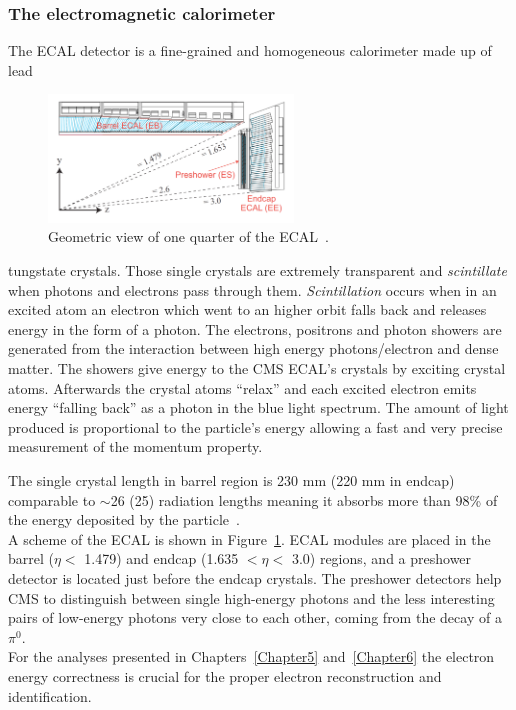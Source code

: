 \subsubsection{The electromagnetic calorimeter}
The ECAL detector is a fine-grained and homogeneous calorimeter
made up of lead
\begin{figure}
  \begin{center}
    \includegraphics[clip,trim=1cm 1cm 1cm 1.9cm, width=0.58\textwidth]{Figures/c2/ecal}
  \end{center}
  \caption{Geometric view of one quarter of the ECAL~\cite{Benaglia_2014}.}
\label{fig:ecal}
\end{figure}
 tungstate crystals. Those single crystals are extremely transparent
 and \emph{scintillate} when photons and electrons pass through
 them. \emph{Scintillation} occurs when in an excited atom an electron
 which went to an higher orbit falls back and
 releases energy in the form of a photon. The electrons, positrons and
 photon showers are generated from the interaction between high energy photons/electron and
 dense matter. The showers give energy to the CMS ECAL's crystals by
 exciting crystal atoms. Afterwards the crystal atoms ``relax'' and each
 excited electron
 emits energy ``falling back'' as a photon in the blue light spectrum.
The amount of light produced is proportional to the particle's energy
 allowing a fast and very precise measurement of the momentum
 property. 

The single crystal length in barrel region is 230 mm (220
 mm in endcap) comparable to $\sim$26 (25) radiation lengths meaning it
 absorbs more than 98\% of the energy deposited by the particle~\cite{Biino_2015}.\\
A scheme of the ECAL is shown in Figure~\ref{fig:ecal}.
ECAL modules are placed in the barrel ($\eta<$ 1.479) and endcap
(1.635 $<\eta<$ 3.0) regions, and a preshower detector is located just
before the endcap crystals. The preshower detectors help CMS to
distinguish between single high-energy photons and the less
interesting pairs of low-energy photons very close to each other, \ie
coming from the decay of a $\pi^0$. \\
For the analyses presented in Chapters~\ref{Chapter5}
and~\ref{Chapter6} the electron energy correctness is crucial for the
proper electron reconstruction and identification.

